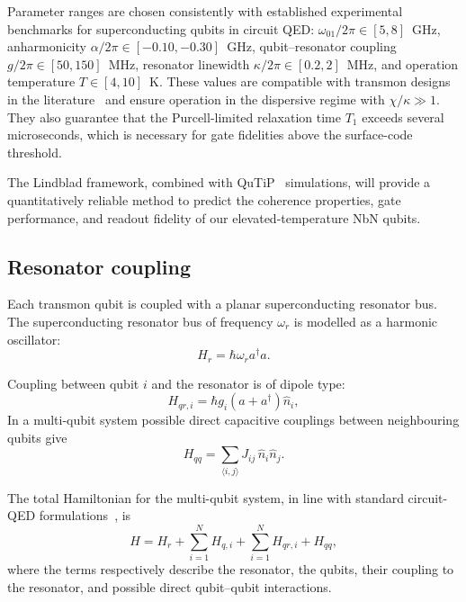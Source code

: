 Parameter ranges are chosen consistently with established experimental 
benchmarks for superconducting qubits in circuit QED: 
$\omega_{01}/2\pi \in [5,8]$~GHz, 
anharmonicity $\alpha/2\pi \in [-0.10,-0.30]$~GHz, 
qubit–resonator coupling $g/2\pi \in [50,150]$~MHz, 
resonator linewidth $\kappa/2\pi \in [0.2,2]$~MHz, 
and operation temperature $T \in [4,10]$~K. 
These values are compatible with transmon designs in the literature~\cite{krantz2019,Paik2011,Barends2014} and ensure operation in the dispersive 
regime with $\chi/\kappa \gg 1$. They also guarantee that the Purcell-limited 
relaxation time $T_1$ exceeds several microseconds, which is necessary 
for gate fidelities above the surface-code threshold.

\medskip
The Lindblad framework, combined with QuTiP~\cite{qutip5} simulations, will provide 
a quantitatively reliable method to predict the coherence properties, gate 
performance, and readout fidelity of our elevated-temperature NbN qubits.

\subsection{Resonator coupling}
Each transmon qubit is coupled with a planar superconducting resonator bus.
The superconducting resonator bus of frequency $\omega_r$ is modelled as a harmonic oscillator:
\begin{equation}
H_r = \hbar \omega_r a^\dagger a.
\end{equation}

Coupling between qubit $i$ and the resonator is of dipole type:
\begin{equation}
H_{qr,i} = \hbar g_i (a+a^\dagger)\hat{n}_i ,
\end{equation}
In a multi-qubit system possible direct capacitive couplings between neighbouring qubits give
\begin{equation}
H_{qq} = \sum_{\langle i,j\rangle} J_{ij}\,\hat{n}_i \hat{n}_j .
\end{equation}

The total Hamiltonian for the multi-qubit system, in line with standard circuit-QED formulations~\cite{Blais2004,Devoret2007}, is
\begin{equation}
H = H_r + \sum_{i=1}^N H_{q,i} + \sum_{i=1}^N H_{qr,i} + H_{qq},
\end{equation}
where the terms respectively describe the resonator, the qubits, their coupling to the resonator, and possible direct qubit–qubit interactions.

